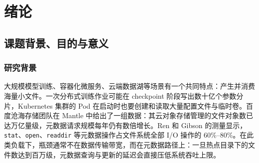 \section{绪\hspace{1em}论}

\subsection{课题背景、目的与意义}

\subsubsection{研究背景}

大规模模型训练、容器化微服务、云端数据湖等场景有一个共同特点：产生并消费海量小文件。一次分布式训练作业可能在 checkpoint 阶段写出数十亿个参数分片，Kubernetes 集群的 Pod 在启动时也要创建和读取大量配置文件与临时卷。百度沧海存储团队在 Mantle\cite{li2025mantle} 中给出了一组数据：其云对象存储管理的文件对象数已达万亿量级，元数据请求规模每年仍有数倍增长。Ren 和 Gibson\cite{ren2013tablefs} 的测量显示，\texttt{stat}、\texttt{open}、\texttt{readdir} 等元数据操作占文件系统全部 I/O 操作的 60\%--80\%。在此类负载下，瓶颈通常不在数据传输带宽，而在元数据路径上：一旦热点目录下的文件数达到百万级，元数据查询与更新的延迟会直接压低系统吞吐上限。

